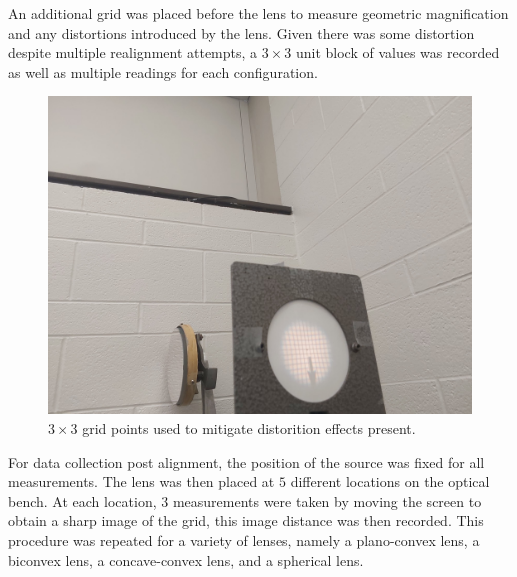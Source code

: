 \documentclass[aip, cp, amsmath, amssymb, reprint, nofootinbib]{revtex4-2}
\begin{document}
        An additional grid was placed before the lens to measure geometric magnification and any distortions introduced by the lens. Given there was some distortion despite multiple realignment attempts, a $3\times3$ unit block of values was recorded as well as multiple readings for each configuration.

        \begin{figure}[H]
            \centering
            \includegraphics[width=0.8\linewidth]{figures/grid.jpeg}
            \caption{$3\times3$ grid points used to mitigate distorition effects present.}
            \label{fig:grid}
        \end{figure}


        For data collection post alignment, the position of the source was fixed for all measurements. The lens was then placed at $5$ different locations on the optical bench. At each location, $3$ measurements were taken by moving the screen to obtain a sharp image of the grid, this image distance was then recorded. This procedure was repeated for a variety of lenses, namely a plano-convex lens, a biconvex lens, a concave-convex lens, and a spherical lens. 
        
\end{document}
